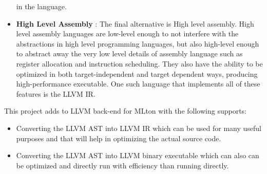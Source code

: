 \documentclass{book}
\begin{document}
\begin{itemize}
		in the language.
		\item \textbf{High Level Assembly} : The final alternative is High level assembly.  High level assembly languages are
		low-level enough to not interfere with the abstractions in high level programming languages,  but  also  high-level  enough  to  abstract  away  the  very  low  level  details
		of assembly language such as register allocation and instruction scheduling.  They also have the ability to be optimized in both target-independent and target dependent
		ways, producing high-performance executable. One such language that implements all of these features is the LLVM IR.
	\end{itemize}
    
    
    This project adds to LLVM back-end for MLton with the following supports:
	\begin{itemize}
		\item Converting the LLVM AST into LLVM IR which can be used for many useful purposes and that will help in optimizing the actual source code.
		\item Converting the LLVM AST into LLVM binary executable  which can also can be optimized and directly run with efficiency than running directly.
	\end{itemize}
	 
\end{document}
